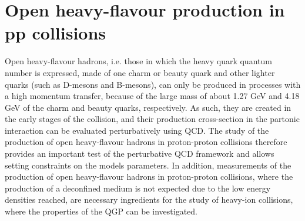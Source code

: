 \chapter{Open heavy-flavour production in pp collisions}

Open heavy-flavour hadrons, i.e. those in which the heavy quark quantum number is expressed, made of one charm or beauty quark and other lighter quarks (such as D-mesons and B-mesons), can only be produced in processes with a high momentum transfer, because of the large mass of about 1.27 GeV and 4.18 GeV of the charm and beauty quarks, respectively. As such, they are created in the early stages of the collision, and their production cross-section in the partonic interaction can be evaluated perturbatively using QCD. The study of the production of open heavy-flavour hadrons in proton-proton collisions therefore provides an important test of the perturbative QCD framework and allows setting constraints on the models parameters. In addition, measurements of the production of open heavy-flavour hadrons in proton-proton collisions, where the production of a deconfined medium is not expected due to the low energy densities reached, are necessary ingredients for the study of heavy-ion collisions, where the properties of the QGP can be investigated. 

